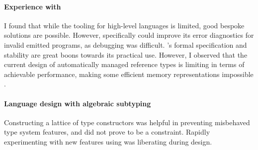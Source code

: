 \paragraph{Experience with \wasm{}}
I found that while the \wasm{} tooling for high-level languages is limited, good bespoke solutions are possible. However, \binaryen{} specifically could improve its error diagnostics for invalid emitted programs, as debugging was difficult. \wasm{}'s formal specification and stability are great boons towards its practical use.
However, I observed that the current design of automatically managed reference types is limiting in terms of achievable performance, \eg{} making some efficient memory representations impossible \cite{double-ended-bit-stealing}.

\paragraph{Language design with algebraic subtyping} Constructing a lattice of type constructors was helpful in preventing misbehaved type system features, and did not prove to be a constraint. Rapidly experimenting with new features using \inference{} was liberating during design.
